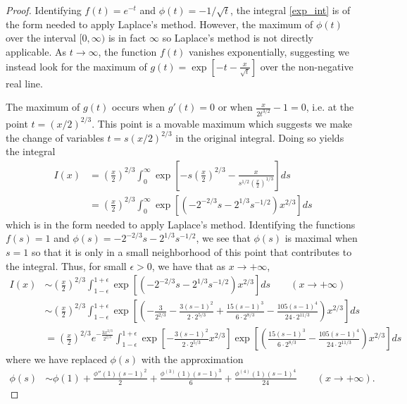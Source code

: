 \documentclass[12pt]{article}
\theoremstyle{definition}
\begin{document}
\begin{proof}
  Identifying $f(t) = e^{-t}$ and $\phi(t) = -1/\sqrt{t}$, the integral \eqref{exp_int} is of
  the form needed to apply Laplace's method. However, the maximum of $\phi(t)$ over the interval $[0, \infty)$
  is in fact $\infty$ so Laplace's method is not directly applicable.
  As $t\to \infty$, the function $f(t)$ vanishes exponentially, suggesting we instead look for the maximum
  of $g(t) = \exp\left[-t - \frac{x}{\sqrt{t}}\right]$ over the non-negative real line.

  The maximum of $g(t)$ occurs when $g'(t)=0$ or when $\frac{x}{2t^{3/2}} - 1 = 0$, i.e. at the point $t = (x/2)^{2/3}$.
  This point is a movable maximum which suggests we make the change of variables $t=s(x/2)^{2/3}$ in the original integral.
  Doing so yields the integral
  \begin{align*}
    I(x) &= \left(\frac{x}{2}\right)^{2/3}\int_0^\infty \exp\left[-s\left(\frac{x}{2}\right)^{2/3} - \frac{x}{s^{1/2}\left(\frac{x}{2}\right)^{1/3}}\right]ds\\
    &= \left(\frac{x}{2}\right)^{2/3}\int_0^\infty \exp\left[ \left(-2^{-2/3}s-2^{1/3}s^{-1/2}\right)x^{2/3}\right]ds
  \end{align*}
  which is in the form needed to apply Laplace's method.
  Identifying the functions $f(s) = 1$ and $\phi(s) = -2^{-2/3}s-2^{1/3}s^{-1/2}$, we see that $\phi(s)$ is maximal when $s=1$ so that it is only
  in a small neighborhood of this point that contributes to the integral. Thus, for small $\epsilon > 0$, we have that as $x \to +\infty$,
  \begin{align*}
    I(x) &\sim \left(\frac{x}{2}\right)^{2/3}\int_{1-\epsilon}^{1+\epsilon} \exp\left[ \left(-2^{-2/3}s-2^{1/3}s^{-1/2}\right)x^{2/3}\right]ds \qquad (x\to +\infty) \\
    &\sim \left(\frac{x}{2}\right)^{2/3}\int_{1-\epsilon}^{1+\epsilon} \exp\left[ \left(-\frac{3}{2^{2/3}}-\frac{3(s-1)^2}{2\cdot2^{5/3}} + \frac{15(s-1)^3}{6\cdot2^{8/3}} - \frac{105(s-1)^4}{24\cdot2^{11/3}} \right)x^{2/3}\right]ds \\
    &= \left(\frac{x}{2}\right)^{2/3}e^{-\frac{3x^{2/3}}{2^{2/3}}}\int_{1-\epsilon}^{1+\epsilon} \exp\left[ -\frac{3(s-1)^2}{2\cdot2^{5/3}}x^{2/3}\right]\exp\left[\left(\frac{15(s-1)^3}{6\cdot2^{8/3}} - \frac{105(s-1)^4}{24\cdot2^{11/3}} \right)x^{2/3}\right]ds
  \end{align*}
  where we have replaced $\phi(s)$ with the approximation
  \begin{align*}
    \phi(s) &\sim \phi(1) + \frac{\phi''(1)(s-1)^2}{2} + \frac{\phi^{(3)}(1)(s-1)^3}{6} + \frac{\phi^{(4)}(1)(s-1)^4}{24} \qquad (x \to +\infty).

\end{align*}
\end{proof}
\end{document}
